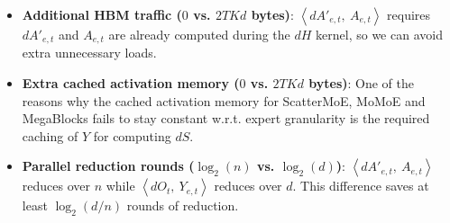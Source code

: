 \begin{itemize}
    \item \textbf{Additional HBM traffic ($0$ vs. $2TKd$ bytes)}: $\left\langle dA'_{e,t},\ A_{e,t}\right\rangle$ requires $dA'_{e,t}$ and $A_{e,t}$ are already computed during the $dH$ kernel, so we can avoid extra unnecessary loads.

    \item \textbf{Extra cached activation memory ($0$ vs. $2TKd$ bytes)}: One of the reasons why the cached activation memory for ScatterMoE, MoMoE and MegaBlocks fails to stay constant w.r.t. expert granularity is the required caching of $Y$ for computing $dS$.


    \item \textbf{Parallel reduction rounds ($\log_2(n)$ vs. $\log_2(d)$)}: $\left\langle dA'_{e,t},\ A_{e,t}\right\rangle$ reduces over $n$ while $\left\langle dO_t,\ Y_{e,t}\right\rangle$ reduces over $d$. This difference saves at least $\log_2(d/n)$ rounds of reduction.
\end{itemize}

